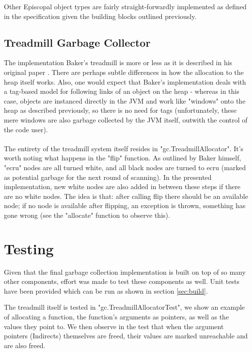 \documentclass[]{article}
\begin{document}
Other Episcopal object types are fairly straight-forwardly implemented as defined in the specification given the building blocks outlined previously.

\subsection{Treadmill Garbage Collector}\label{sec:design:gc}
The implementation Baker's treadmill is more or less as it is described in his original paper \cite{ref:baker:treadmill}. There are perhaps subtle differences in how the allocation to the heap itself works. Also, one would expect that Baker's implementation deals with a tag-based model for following links of an object on the heap - whereas in this case, objects are instanced directly in the JVM and work like "windows" onto the heap as described previously, so there is no need for tags (unfortunately, these mere windows are also garbage collected by the JVM itself, outwith the control of the code user).
\\\\
The entirety of the treadmill system itself resides in "gc.TreadmillAllocator". It's worth noting what happens in the "flip" function. As outlined by Baker himself, "ecru" nodes are all turned white, and all black nodes are turned to ecru (marked as potential garbage for the next round of scanning). In the presented implementation, new white nodes are also added in between these steps if there are no white nodes. The idea is that: after calling flip there should be an available node; if no node is available after flipping, an exception is thrown, something has gone wrong (see the "allocate" function to observe this).

\section{Testing}\label{sec:testing}
Given that the final garbage collection implementation is built on top of so many other components, effort was made to test these components as well. Unit tests have been provided which can be run as shown in section \ref{sec:build}.

The treadmill itself is tested in "gc.TreadmillAllocatorTest", we show an example of allocating a function, the function's arguments as pointers, as well as the values they point to. We then observe in the test that when the argument pointers (Indirects) themselves are freed, their values are marked unreachable and are also freed.
\end{document}
